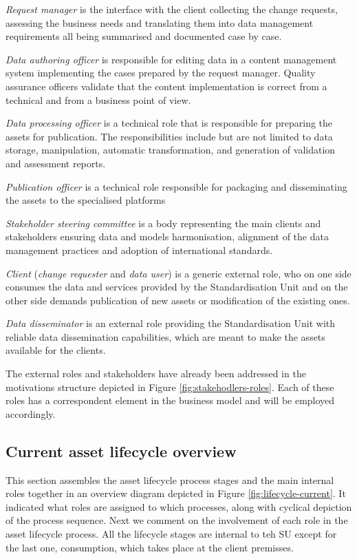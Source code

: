 	\textit{Request manager} is the interface with the client collecting the change requests, assessing the business needs and translating them into data management requirements all being summarised and documented case by case. 
	
	\textit{Data authoring officer} is responsible for editing data in a content management system implementing the cases prepared by the request manager.
	Quality assurance officers validate that the content implementation is correct from a technical and from a business point of view. 
	
	\textit{Data processing officer} is a technical role that is responsible for preparing the assets for publication. The responsibilities include but are not limited to data storage, manipulation, automatic transformation, and generation of validation and assessment reports. 
	
	\textit{Publication officer} is a technical role responsible for packaging and disseminating the assets to the specialised platforms
	
	\textit{Stakeholder steering committee} is a body representing the main clients and stakeholders ensuring data and models harmonisation, alignment of the data management practices and adoption of international standards.
	
	\textit{Client} (\textit{change requester} and \textit{data user}) is a generic external role, who on one side consumes the data and services provided by the Standardisation Unit and on the other side demands publication of new assets or modification of the existing ones. 
	
	\textit{Data disseminator} is an external role providing the Standardisation Unit with reliable data dissemination capabilities, which are meant to make the assets available for the clients.

	The external roles and stakeholders have already been addressed in the motivations structure depicted in Figure \ref{fig:stakehodlers-roles}. Each of these roles has a correspondent element in the business model and will be employed accordingly.

	\subsection{Current asset lifecycle overview}
	\label{sec:lifecycle-current}
	
	This section assembles the asset lifecycle process stages and the main internal roles together in an overview diagram depicted in Figure \ref{fig:lifecycle-current}. It indicated what roles are assigned to which processes, along with cyclical depiction of the process sequence. Next we comment on the involvement of each role in the asset lifecycle process. All the lifecycle stages are internal to teh SU except for the last one, consumption, which takes place at the client premisses.
	
